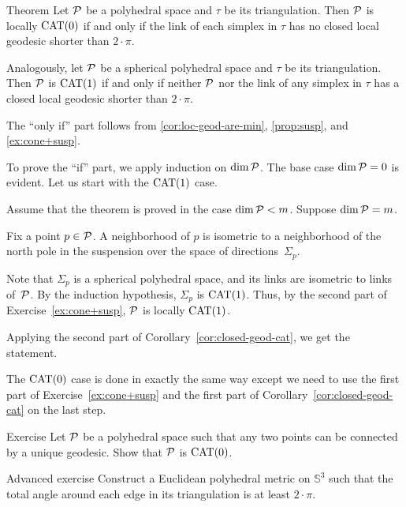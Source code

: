 \begin{thm}{Theorem}\label{thm:PL-CAT}
Let $\mathcal{P}$ be a polyhedral space and $\tau$ be its triangulation. 
Then $\mathcal{P}$ is locally $\mathrm{CAT}(0)$ if and only if the link of each simplex in $\tau$ has no closed local geodesic shorter than $2\cdot\pi$.

Analogously, let $\mathcal{P}$ be a spherical polyhedral space and $\tau$ be its triangulation. 
Then $\mathcal{P}$ is $\mathrm{CAT}(1)$ if and only if neither $\mathcal{P}$ nor  the  link of any simplex in $\tau$ has a closed local geodesic shorter than $2\cdot\pi$.
\end{thm}





The ``only if'' part follows from \ref{cor:loc-geod-are-min}, \ref{prop:susp}, and \ref{ex:cone+susp}.

To prove the ``if'' part,
we apply induction on $\operatorname{\rm dim}\nolimits\mathcal{P}$.
The base case $\operatorname{\rm dim}\nolimits\mathcal{P}=0$ is evident.
Let us start with the $\mathrm{CAT}(1)$ case.

Assume that the theorem is proved in the case $\operatorname{\rm dim}\nolimits\mathcal{P}<m$. Suppose  $\operatorname{\rm dim}\nolimits\mathcal{P}=m$.


Fix a point $p\in\mathcal{P}$.
A neighborhood of $p$ 
is isometric to a neighborhood of the north pole in the suspension over the space of directions~$\Sigma_p$.

Note that $\Sigma_p$ is a spherical polyhedral space, 
and its  links are isometric to  links of~$\mathcal{P}$. 
By the  induction hypothesis, $\Sigma_p$ is $\mathrm{CAT}(1)$.
Thus, by the second part of Exercise~\ref{ex:cone+susp}, $\mathcal{P}$ is locally  $\mathrm{CAT}(1)$.


Applying the second part of Corollary~\ref{cor:closed-geod-cat},
we get the statement.

The $\mathrm{CAT}(0)$ case is done in exactly the same way except we need to use the first part of Exercise~\ref{ex:cone+susp} and  the first part of Corollary~\ref{cor:closed-geod-cat} on the last step.
\qeds

\begin{thm}{Exercise}\label{ex:unique-geod=CAT}
Let $\mathcal{P}$
be a polyhedral space such that any two points can be connected by a unique geodesic.
Show that $\mathcal{P}$ is $\mathrm{CAT}(0)$.
\end{thm}

\begin{thm}{Advanced exercise}\label{ex:S3}
Construct a Euclidean polyhedral metric on $\mathbb{S}^3$
such that the total angle around each edge in its triangulation is at least $2\cdot \pi$.
\end{thm}


